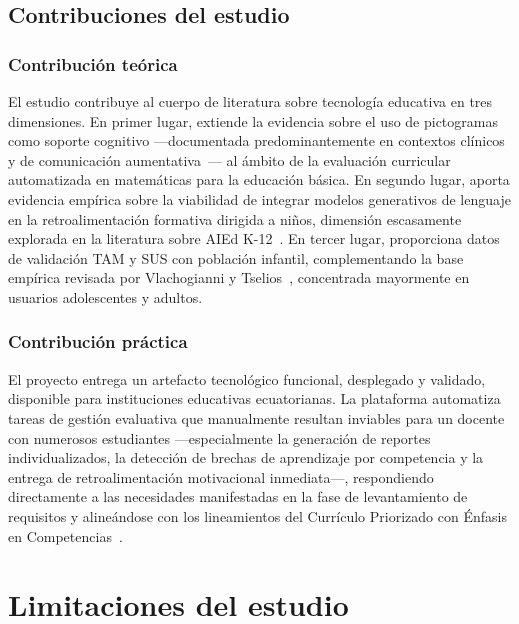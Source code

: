 \subsection{Contribuciones del estudio}
\label{sec:contribuciones}

\subsubsection*{Contribución teórica}

El estudio contribuye al cuerpo de literatura sobre tecnología educativa en
tres dimensiones. En primer lugar, extiende la evidencia sobre el uso de
pictogramas como soporte cognitivo ---documentada predominantemente en contextos
clínicos y de comunicación aumentativa~\cite{paolieri2018arasaac}--- al ámbito
de la evaluación curricular automatizada en matemáticas para la educación
básica. En segundo lugar, aporta evidencia empírica sobre la viabilidad de
integrar modelos generativos de lenguaje en la retroalimentación formativa
dirigida a niños, dimensión escasamente explorada en la literatura sobre
AIEd K-12~\cite{topali2025aied,mousavinasab2018its}. En tercer lugar,
proporciona datos de validación TAM y SUS con población infantil,
complementando la base empírica revisada por Vlachogianni y
Tselios~\cite{vlachogianni2022sus}, concentrada mayormente en usuarios
adolescentes y adultos.

\subsubsection*{Contribución práctica}

El proyecto entrega un artefacto tecnológico funcional, desplegado y validado,
disponible para instituciones educativas ecuatorianas. La plataforma automatiza
tareas de gestión evaluativa que manualmente resultan inviables para un docente
con numerosos estudiantes ---especialmente la generación de reportes
individualizados, la detección de brechas de aprendizaje por competencia y la
entrega de retroalimentación motivacional inmediata---, respondiendo
directamente a las necesidades manifestadas en la fase de levantamiento de
requisitos y alineándose con los lineamientos del Currículo Priorizado con
Énfasis en Competencias~\cite{mineduc2021curriculo}.

\section{Limitaciones del estudio}
\label{sec:limitaciones}

